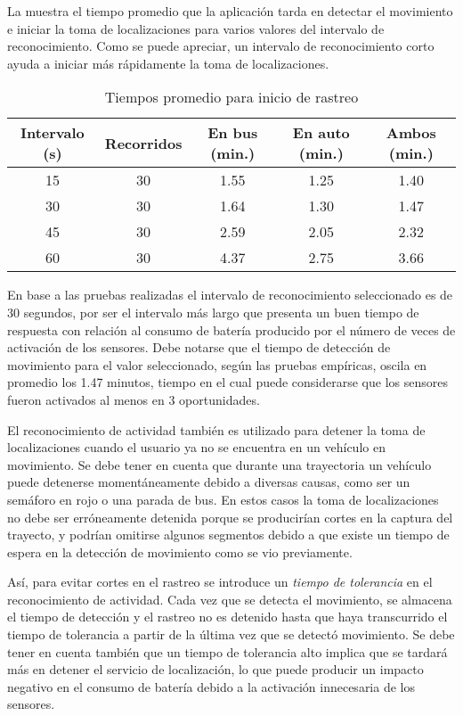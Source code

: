 La  muestra el tiempo promedio que la aplicación tarda en detectar el movimiento e iniciar la toma de localizaciones para varios valores del intervalo de reconocimiento. Como se puede apreciar, un intervalo de reconocimiento corto ayuda a iniciar más rápidamente la toma de localizaciones.

\begin{table}[h]
  \centering
	\begin{tabular}{ccccc}
	\toprule
	Intervalo (s) & Recorridos & En bus (min.) & En auto (min.) & Ambos (min.) \\
	\midrule
	15            & 30       & 1.55         & 1.25            & 1.40         \\
	30            & 30       & 1.64         & 1.30            & 1.47         \\
	45            & 30       & 2.59         & 2.05            & 2.32         \\
	60            & 30       & 4.37         & 2.75            & 3.66         \\
	\bottomrule
	\end{tabular}
  \caption{Tiempos promedio para inicio de rastreo}
  \label{tab:prom_intervalo_reconocimiento}
\end{table}

En base a las pruebas realizadas el intervalo de reconocimiento seleccionado es de 30 segundos, por ser el intervalo más largo que presenta un buen tiempo de respuesta con relación al consumo de batería producido por el número de veces de activación de los sensores. Debe notarse que el tiempo de detección de movimiento para el valor seleccionado, según las pruebas empíricas, oscila en promedio los 1.47 minutos, tiempo en el cual puede considerarse que los sensores fueron activados al menos en 3 oportunidades.

El reconocimiento de actividad también es utilizado para detener la toma de localizaciones cuando el usuario ya no se encuentra en un vehículo en movimiento. Se debe tener en cuenta que durante una trayectoria un vehículo puede detenerse momentáneamente debido a diversas causas, como ser un semáforo en rojo o una parada de bus. En estos casos la toma de localizaciones no debe ser erróneamente detenida porque se producirían cortes en la captura del trayecto, y podrían omitirse algunos segmentos debido a que existe un tiempo de espera en la detección de movimiento como se vio previamente.

Así, para evitar cortes en el rastreo se introduce un \emph{tiempo de tolerancia} en el reconocimiento de actividad. Cada vez que se detecta el movimiento, se almacena el tiempo de detección y el rastreo no es detenido hasta que haya transcurrido el tiempo de tolerancia a partir de la última vez que se detectó movimiento. Se debe tener en cuenta también que un tiempo de tolerancia alto implica que se tardará más en detener el servicio de localización, lo que puede producir un impacto negativo en el consumo de batería debido a la activación innecesaria de los sensores.

